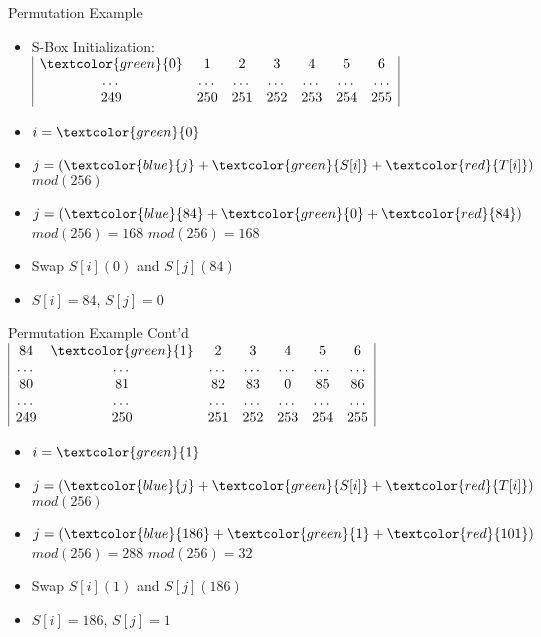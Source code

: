\documentclass[
	aspectratio=169,	%
	onlytextwidth,		%
	t,					%
	]{beamer}
\begin{document}
\begin{frame}{Permutation Example}
	\begin{itemize}
		\item S-Box Initialization:
		\medskip
		$\begin{array}{|ccccccc|}
		\textcolor{green}{0} & 1 & 2 & 3 & 4 & 5 & 6 \\
		\dots & \dots & \dots & \dots & \dots & \dots & \dots \\
		249 & 250 & 251 & 252 & 253 & 254 & 255 \\
		\end{array}$
		\item $i = \textcolor{green}{0}$
		\item $j = (\textcolor{blue} {j} + \textcolor{green}{S[i]} + \textcolor{red}{T[i]})$ $mod(256)$
		\item $j = (\textcolor{blue} {84} + \textcolor{green} {0} + \textcolor{red} {84})$ $mod(256) = 168$ $mod (256) = 168$
		\item Swap $S[i] (0)$ and $S[j] (84)$
		\item $S[i] = 84$, $S[j] = 0$
	\end{itemize}
\end{frame}

\begin{frame}{Permutation Example Cont'd}
	$\begin{array}{|ccccccc|}
		84 & \textcolor{green}{1} & 2 & 3 & 4 & 5 & 6 \\
		\dots & \dots & \dots & \dots & \dots & \dots & \dots \\
		80 & 81 & 82 & 83 & 0 & 85 & 86 \\
		\dots & \dots & \dots & \dots & \dots & \dots & \dots \\
		249 & 250 & 251 & 252 & 253 & 254 & 255 \\
	\end{array}$
	\begin{itemize}
		\item $i = \textcolor{green}{1}$
		\item $j = (\textcolor{blue} {j} + \textcolor{green}{S[i]} + \textcolor{red}{T[i]})$ $mod(256)$
		\item $j = (\textcolor{blue} {186} + \textcolor{green} {1} + \textcolor{red} {101})$ $mod(256) = 288$ $mod (256) = 32$
		\item Swap $S[i] (1)$ and $S[j] (186)$
		\item $S[i] = 186$, $S[j] = 1$
	\end{itemize}
\end{frame}
\end{document}
